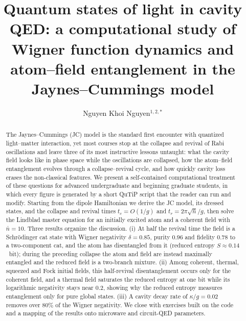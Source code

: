 \documentclass{iopjournal}
\begin{document}

\title{Quantum states of light in cavity QED: a computational study of Wigner function dynamics and atom--field entanglement in the Jaynes--Cummings model}

\author{Nguyen Khoi Nguyen$^{1,2,*}$}






\begin{abstract}
The Jaynes--Cummings (JC) model is the standard first encounter with quantized light--matter interaction, yet most courses stop at the collapse and revival of Rabi oscillations and leave three of its most instructive lessons untaught: what the cavity field looks like in phase space while the oscillations are collapsed, how the atom--field entanglement evolves through a collapse--revival cycle, and how quickly cavity loss erases the non-classical features. We present a self-contained computational treatment of these questions for advanced undergraduate and beginning graduate students, in which every figure is generated by a short QuTiP script that the reader can run and modify. Starting from the dipole Hamiltonian we derive the JC model, its dressed states, and the collapse and revival times $t_c = O(1/g)$ and $t_r = 2\pi\sqrt{\bar{n}}/g$, then solve the Lindblad master equation for an initially excited atom and a coherent field with $\bar{n} = 10$. Three results organize the discussion. (i) At half the revival time the field is a Schr\"{o}dinger cat state with Wigner negativity $\delta = 0.85$, purity 0.96 and fidelity 0.78 to a two-component cat, and the atom has disentangled from it (reduced entropy $S \approx 0.14$~bit); during the preceding collapse the atom and field are instead maximally entangled and the reduced field is a two-branch mixture. (ii) Among coherent, thermal, squeezed and Fock initial fields, this half-revival disentanglement occurs only for the coherent field, and a thermal field saturates the reduced entropy at one bit while its logarithmic negativity stays near 0.2, showing why the reduced entropy measures entanglement only for pure global states. (iii) A cavity decay rate of $\kappa/g = 0.02$ removes over 80\% of the Wigner negativity. We close with exercises built on the code and a mapping of the results onto microwave and circuit-QED parameters.
\end{abstract}
\end{document}
